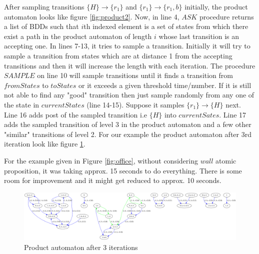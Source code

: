 \documentclass{article}
\begin{document}
After sampling transitions $\{H\} \rightarrow \{r_1\}$ and $\{r_1\}\rightarrow \{r_1,b\}$ initially, the product automaton looks like figure \ref{fig:product2}. Now, in line 4, $ASK$ procedure returns a list of BDDs such that $i$th indexed element is a set of states from which there exist a path in the product automaton of length $i$ whose last transition is an accepting one. In lines 7-13, it tries to sample a transition. Initially it will try to sample a transition from states which are at distance 1 from the accepting transitions and then it will increase the length with each iteration. The procedure $SAMPLE$ on line 10 will sample transitions until it finds a transition from $fromStates$ to $toStates$ or it exceeds a given threshold time/number.
If it is still not able to find any "good" transition then just sample randomly from any one of the state in $currentStates$ (line 14-15). Suppose it samples $\{r_1\}\rightarrow \{H\}$ next. Line 16 adds post of the sampled transition i.e $\{H\}$ into $currentSates$. Line 17 adds the sampled transition of level 3 in the product automaton and a few other "similar" transitions of level 2. For our example the product automaton after 3rd iteration look like figure \ref{fig:product3}.

For the example given in Figure \ref{fig:office}, without considering $wall$ atomic proposition, it was taking approx. 15 seconds to do everything. There is some room for improvement and it might get reduced to approx. 10 seconds.

\begin{figure}
	\centering
	\includegraphics[width=\linewidth]{Fig/product3} \caption{Product automaton after 3 iterations}
	\label{fig:product3}
\end{figure}
\end{document}
